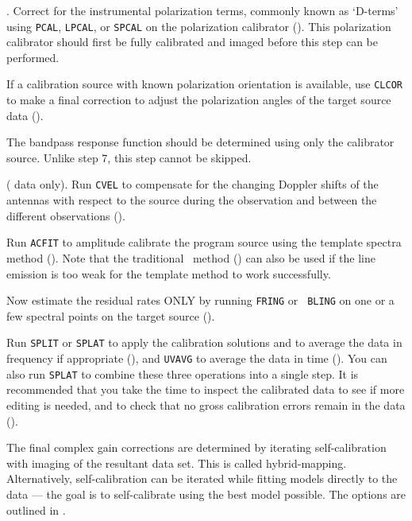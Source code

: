 .
Correct for the instrumental polarization terms, commonly known as
`D-terms' using {\tt PCAL}, {\tt LPCAL}, or {\tt SPCAL} on the
polarization calibrator ().  This polarization
calibrator should first be fully calibrated and imaged before this
step can be performed.

If a calibration source with known polarization orientation is
available, use {\tt CLCOR} to make a final correction to adjust the
polarization angles of the target source data ().

The bandpass response function should be determined using only the
calibrator source.  Unlike step 7, this step cannot be skipped.

 (
data only).
Run {\tt CVEL} to compensate for the changing Doppler shifts of the
antennas with respect to the source during the observation and between
the different observations ().

Run {\tt ACFIT} to amplitude calibrate the program source using the
template spectra method ().  Note that the traditional
\Tsys\ method () can also be used if the line
emission is too weak for the template method to work successfully.

Now estimate the residual rates ONLY by running {\tt FRING} or {\tt
BLING} on one or a few spectral points on the target source
().

Run {\tt SPLIT} or {\tt SPLAT} to apply the calibration solutions
and to average the data in frequency if appropriate (),
and {\tt UVAVG} to average the data in time ().  You can
also run {\tt SPLAT} to combine these three operations into a single
step.  It is recommended that you take the time to inspect the
calibrated data to see if more editing is needed, and to check that no
gross calibration errors remain in the data ().

The final complex gain corrections are determined by iterating
self-calibration with imaging of the resultant data set.  This is
called hybrid-mapping.  Alternatively, self-calibration can be
iterated while fitting models directly to the data --- the goal is to
self-calibrate using the best model possible.  The options are
outlined in .

